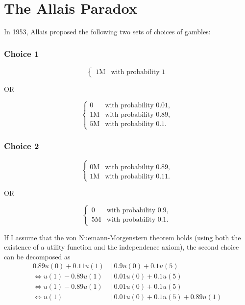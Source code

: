 \documentclass{article}
\begin{document}
\section{The Allais Paradox} 

In 1953, Allais proposed the following two sets of choices of gambles:

\subsubsection{Choice 1}

\begin{equation*}
\left\{
\begin{array}{rl}
1\text{M} & \text{with probability } 1
\end{array} \right.
\end{equation*}

OR

\begin{equation*}
\left\{
\begin{array}{rl}
0 & \text{with probability } 0.01,
\\1\text{M} & \text{with probability } 0.89,
\\5\text{M} & \text{with probability } 0.1.
\end{array} \right.
\end{equation*}

\subsubsection{Choice 2}

\begin{equation*}
\left\{
\begin{array}{rl}
\\0\text{M} & \text{with probability } 0.89,
\\1\text{M} & \text{with probability } 0.11.
\end{array} \right.
\end{equation*}

OR

\begin{equation*}
\left\{
\begin{array}{rl}
0 & \text{with probability } 0.9,
\\5\text{M} & \text{with probability } 0.1.
\end{array} \right.
\end{equation*}

If I assume that the von Nuemann-Morgenstern theorem holds (using both the existence of a utility function and the independence axiom), the second choice can be decomposed as 
\begin{align*}
0.89u(0)+0.11u(1)\, &|\, 0.9u(0)+0.1u(5) \\
\Leftrightarrow u(1)-0.89u(1) \, &|\, 0.01u(0)+0.1u(5) \\
\Leftrightarrow u(1)-0.89u(1) \, &|\, 0.01u(0)+0.1u(5) \\
\Leftrightarrow u(1) \, &|\, 0.01u(0)+0.1u(5)+0.89u(1)
\end{align*}
\end{document}

